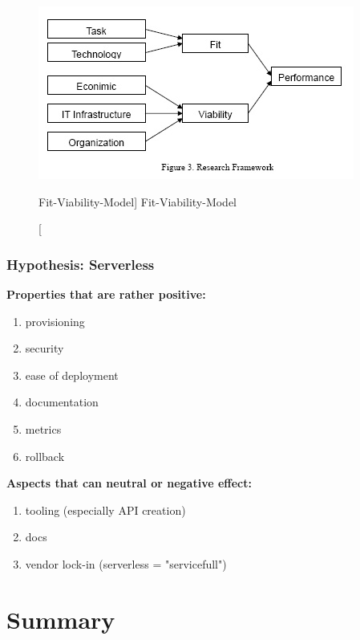 \begin{figure}[ht]
    \includegraphics[width=0.7\linewidth]{images/methodology/fvm.jpg}\centering
    \caption
    [Fit-Viability-Model]
    {Fit-Viability-Model \cite{Liang2007AdoptionModel}}
\end{figure}

\subsubsection{Hypothesis: Serverless}

\textbf{Properties that are rather positive:}
\begin{enumerate}\label{lst:viabPro}
    \item provisioning
    \item security
    \item ease of deployment
    \item documentation
    \item metrics
    \item rollback
\end{enumerate}

\textbf{Aspects that can neutral or negative effect:}
\begin{enumerate}\label{lst:viabCon}
    \item tooling (especially API creation)
    \item docs
    \item vendor lock-in (serverless = "servicefull")
\end{enumerate}


\section{Summary}
